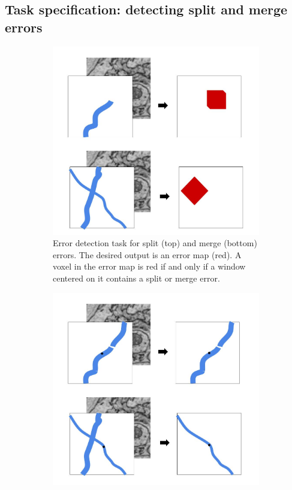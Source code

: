 \documentclass{article}
\begin{document}
\subsection{Task specification: detecting split and merge errors}
\label{sec:detection_spec}
\begin{figure}[t!]
	\begin{center}
	\begin{subfigure}[t]{0.45\textwidth}
		\includegraphics[width=1.0\linewidth]{detection_task.jpg}
		\caption{Error detection task for split (top) and merge (bottom) errors. The desired output is an error map (red). A voxel in the error map is red if and only if a window centered on it contains a split or merge error.}
		\label{fig:error_detection_cartoon}
	\end{subfigure}
\hfill
	\begin{subfigure}[t]{0.45\textwidth}
	\includegraphics[width=1.0\linewidth]{correction_task.jpg}

\end{subfigure}
\end{center}
\end{figure}
\end{document}
